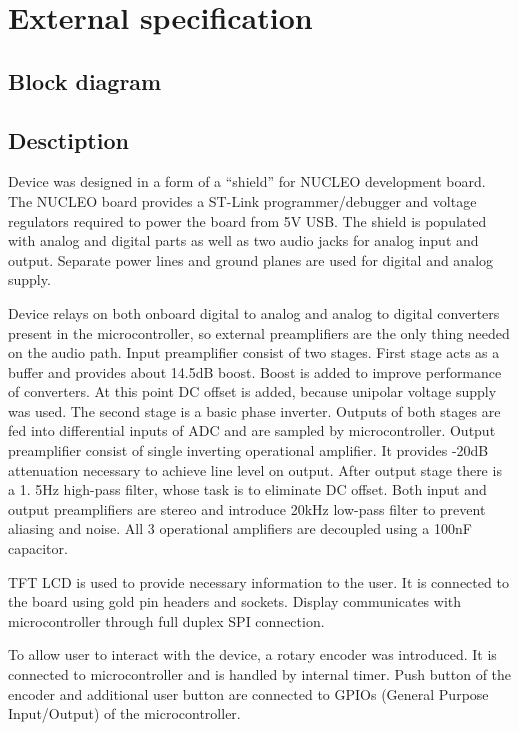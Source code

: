 \documentclass[a4paper,twoside,12pt]{book}
\begin{document}
\chapter{External specification}

\section{Block diagram}

\section{Desctiption}
Device was designed in a form of a “shield” for NUCLEO development board.
The NUCLEO board provides a ST-Link programmer/debugger and voltage regulators required to power the board from 5V USB.
The shield is populated with analog and digital parts as well as two audio jacks for analog input and output.
Separate power lines and ground planes are used for digital and analog supply.

Device relays on both onboard digital to analog and analog to digital converters present in the microcontroller, so external preamplifiers are the only thing needed on the audio path.
Input preamplifier consist of two stages.
First stage acts as a buffer and provides about 14.5dB boost.
Boost is added to improve performance of converters.
At this point DC offset is added, because unipolar voltage supply was used.
The second stage is a basic phase inverter.
Outputs of both stages are fed into differential inputs of ADC and are sampled by microcontroller.
Output preamplifier consist of single inverting operational amplifier.
It provides -20dB attenuation necessary to achieve line level on output.
After output stage there is a 1.
5Hz high-pass filter, whose task is to eliminate DC offset.
Both input and output preamplifiers are stereo and introduce 20kHz low-pass filter to prevent aliasing and noise.
All 3 operational amplifiers are decoupled using a 100nF capacitor.

TFT LCD is used to provide necessary information to the user.
It is connected to the board using gold pin headers and sockets.
Display communicates with microcontroller through full duplex SPI connection.

To allow user to interact with the device, a rotary encoder was introduced.
It is connected to microcontroller and is handled by internal timer.
Push button of the encoder and additional user button are connected to GPIOs (General Purpose Input/Output) of the microcontroller.
\end{document}
